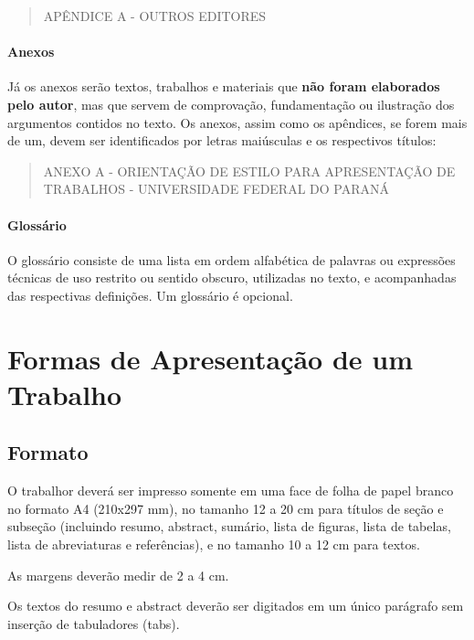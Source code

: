 \documentclass[repeatfields,xlists,xpacks,oneside]{ufrgscca}
\begin{document}
\begin{quote}APÊNDICE A  - OUTROS EDITORES\\\end{quote}

\subsubsection{Anexos}

Já os anexos serão textos, trabalhos e materiais que {\bf não foram
elaborados pelo autor}, mas que servem de comprovação, fundamentação ou
ilustração dos argumentos contidos no texto. Os anexos, assim como os
apêndices, se forem mais de um, devem ser identificados por letras
maiúsculas e os respectivos títulos:\\

\begin{quote}ANEXO A - ORIENTAÇÃO DE ESTILO PARA APRESENTAÇÃO DE TRABALHOS - UNIVERSIDADE FEDERAL DO PARANÁ\\\end{quote}

\subsubsection{Glossário}

O glossário consiste de uma lista em ordem alfabética de palavras ou
expressões técnicas de uso restrito ou sentido obscuro, utilizadas no texto,
e acompanhadas das respectivas definições. Um glossário é opcional.

\chapter{Formas de Apresentação de um Trabalho}
\label{formas}

\section{Formato}

O trabalhor deverá ser impresso somente em uma face de folha de papel
branco no formato A4 (210x297 mm), no tamanho 12 a 20 cm para títulos de
seção e subseção (incluindo resumo, abstract, sumário, lista de figuras,
lista de tabelas, lista de abreviaturas e referências), e no tamanho 10 a 12
cm para textos.

As margens deverão medir de 2 a 4 cm.

Os textos do resumo e abstract deverão ser digitados em um único parágrafo
sem inserção de tabuladores (tabs).
\end{document}
